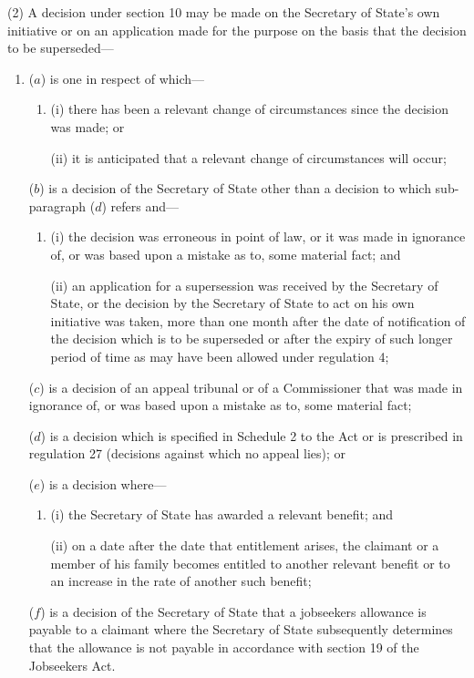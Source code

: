 \documentclass[12pt,a4paper]{article}
\begin{document}
(2) A decision under section 10 may be made on the Secretary of State’s own initiative or on an application made for the purpose on the basis that the decision to be superseded—
\begin{enumerate}\item[]
($a$) is one in respect of which—
\begin{enumerate}\item[]
(i) there has been a relevant change of circumstances since the decision was made; or

(ii) it is anticipated that a relevant change of circumstances will occur;
\end{enumerate}

($b$) is a decision of the Secretary of State other than a decision to which sub-paragraph ($d$) refers and—
\begin{enumerate}\item[]
(i) the decision was erroneous in point of law, or it was made in ignorance of, or was based upon a mistake as to, some material fact; and

(ii) an application for a supersession was received by the Secretary of State, or the decision by the Secretary of State to act on his own initiative was taken, more than one month after the date of notification of the decision which is to be superseded or after the expiry of such longer period of time as may have been allowed under regulation 4;
\end{enumerate}

($c$) is a decision of an appeal tribunal or of a Commissioner that was made in ignorance of, or was based upon a mistake as to, some material fact;

($d$) is a decision which is specified in Schedule 2 to the Act or is prescribed in regulation 27 (decisions against which no appeal lies); or

($e$) is a decision where—
\begin{enumerate}\item[]
(i) the Secretary of State has awarded a relevant benefit; and

(ii) on a date after the date that entitlement arises, the claimant or a member of his family becomes entitled to another relevant benefit or to an increase in the rate of another such benefit;
\end{enumerate}

($f$) is a decision of the Secretary of State that a jobseekers allowance is payable to a claimant where the Secretary of State subsequently determines that the allowance is not payable in accordance with section 19 of the Jobseekers Act.
\end{enumerate}
\end{document}
